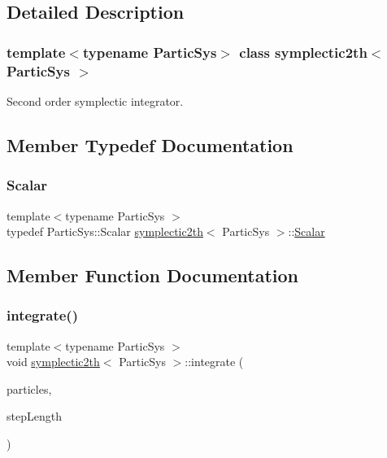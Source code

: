 \subsection{Detailed Description}
\subsubsection*{template$<$typename Partic\+Sys$>$\newline
class symplectic2th$<$ Partic\+Sys $>$}

Second order symplectic integrator. 

\subsection{Member Typedef Documentation}
\mbox{\label{classsymplectic2th_a08d72f435fb4c69320ead95ba05625a1}} 
\subsubsection{\texorpdfstring{Scalar}{Scalar}}
{\footnotesize\ttfamily template$<$typename Partic\+Sys $>$ \\
typedef Partic\+Sys\+::\+Scalar \mbox{\hyperlink{classsymplectic2th}{symplectic2th}}$<$ Partic\+Sys $>$\+::\mbox{\hyperlink{classsymplectic2th_a08d72f435fb4c69320ead95ba05625a1}{Scalar}}\hspace{0.3cm}{\ttfamily [private]}}



\subsection{Member Function Documentation}
\mbox{\label{classsymplectic2th_ade78f67685ed50280a210e67397af092}} 
\subsubsection{\texorpdfstring{integrate()}{integrate()}}
{\footnotesize\ttfamily template$<$typename Partic\+Sys $>$ \\
void \mbox{\hyperlink{classsymplectic2th}{symplectic2th}}$<$ Partic\+Sys $>$\+::integrate (\begin{DoxyParamCaption}\item[{Partic\+Sys \&}]{particles,  }\item[{\mbox{\hyperlink{classsymplectic2th_a08d72f435fb4c69320ead95ba05625a1}{Scalar}}}]{step\+Length }\end{DoxyParamCaption})}



